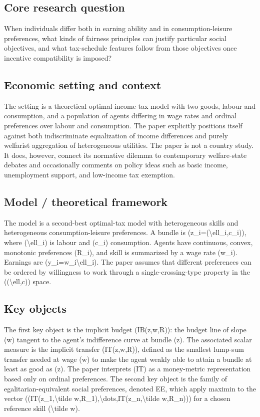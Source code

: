 \documentclass[11pt,a4paper]{article}
\begin{document}
\subsection*{Core research question}
When individuals differ both in earning ability and in consumption-leisure preferences, what kinds of fairness principles can justify particular social objectives, and what tax-schedule features follow from those objectives once incentive compatibility is imposed?

\subsection*{Economic setting and context}
The setting is a theoretical optimal-income-tax model with two goods, labour and consumption, and a population of agents differing in wage rates and ordinal preferences over labour and consumption. The paper explicitly positions itself against both indiscriminate equalization of income differences and purely welfarist aggregation of heterogeneous utilities. The paper is not a country study. It does, however, connect its normative dilemma to contemporary welfare-state debates and occasionally comments on policy ideas such as basic income, unemployment support, and low-income tax exemption.

\subsection*{Model / theoretical framework}
The model is a second-best optimal-tax model with heterogeneous skills and heterogeneous consumption-leisure preferences. A bundle is (z\_i=(\textbackslash{}ell\_i,c\_i)), where (\textbackslash{}ell\_i) is labour and (c\_i) consumption. Agents have continuous, convex, monotonic preferences (R\_i), and skill is summarized by a wage rate (w\_i). Earnings are (y\_i=w\_i\textbackslash{}ell\_i). The paper assumes that different preferences can be ordered by willingness to work through a single-crossing-type property in the ((\textbackslash{}ell,c)) space.

\subsection*{Key objects}
The first key object is the implicit budget (IB(z,w,R)): the budget line of slope (w) tangent to the agent’s indifference curve at bundle (z). The associated scalar measure is the implicit transfer (IT(z,w,R)), defined as the smallest lump-sum transfer needed at wage (w) to make the agent weakly able to attain a bundle at least as good as (z). The paper interprets (IT) as a money-metric representation based only on ordinal preferences. The second key object is the family of egalitarian-equivalent social preferences, denoted EE, which apply maximin to the vector ((IT(z\_1,\textbackslash{}tilde w,R\_1),\textbackslash{}dots,IT(z\_n,\textbackslash{}tilde w,R\_n))) for a chosen reference skill (\textbackslash{}tilde w).
\end{document}
